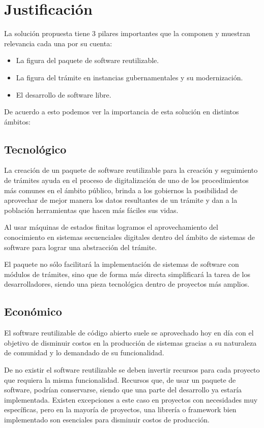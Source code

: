 \section{Justificación}
La solución propuesta tiene 3 pilares importantes que la componen y muestran relevancia cada una por su cuenta:

\begin{itemize}
    \item La figura del paquete de software reutilizable.
    \item La figura del trámite en instancias gubernamentales y su modernización.
    \item El desarrollo de software libre.
\end{itemize}

De acuerdo a esto podemos ver la importancia de esta solución en distintos ámbitos:

\subsection{Tecnológico}
La creación de un paquete de software reutilizable para la creación y
seguimiento de trámites ayuda en el proceso de digitalización de uno de los
procedimientos más comunes en el ámbito público, brinda a los gobiernos la
posibilidad de aprovechar de mejor manera los datos resultantes de un trámite y
dan a la población herramientas que hacen más fáciles sus vidas.

Al usar máquinas de estados finitas logramos el aprovechamiento del conocimiento
en sistemas secuenciales digitales dentro del ámbito de sistemas de software
para lograr una abstracción del trámite.

El paquete no sólo facilitará la implementación de sistemas de software con
módulos de trámites, sino que de forma más directa simplificará la tarea de los
desarrolladores, siendo una pieza tecnológica dentro de proyectos más amplios.

\subsection{Económico}
El software reutilizable de código abierto suele se aprovechado hoy en día con el objetivo de
disminuir costos en la producción de sistemas gracias a su naturaleza de
comunidad y lo demandado de su funcionalidad.

De no existir el software reutilizable se deben invertir recursos para cada
proyecto que requiera la misma funcionalidad. Recursos que, de usar un paquete
de software, podrían conservarse, siendo que una parte del desarrollo ya estaría
implementada. Existen excepciones a este caso en proyectos con necesidades muy
específicas, pero en la mayoría de proyectos, una librería o framework bien
implementado son esenciales para disminuir costos de producción.

